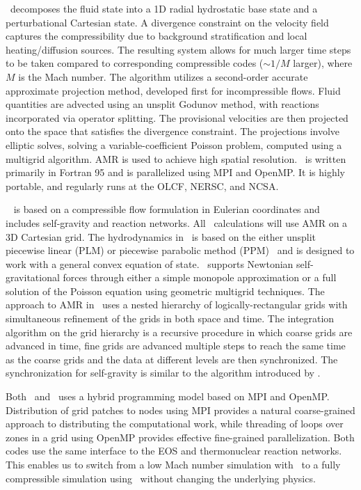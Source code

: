 \maestro\ decomposes the fluid state into a 1D radial hydrostatic base
state and a perturbational Cartesian state.  A divergence constraint
on the velocity field captures the compressibility due to background
stratification and local heating/diffusion sources.  The resulting
system allows for much larger time steps to be taken compared to
corresponding compressible codes ($\sim 1/M$ larger), where $M$ is 
the Mach number.
The algorithm
\cite{multilevel} utilizes a second-order accurate approximate
projection method, developed first for incompressible flows.  Fluid
quantities are advected using an unsplit Godunov method, with
reactions incorporated via operator splitting.  The provisional
velocities are then projected onto the space that satisfies the
divergence constraint.  The projections involve elliptic solves,
solving a variable-coefficient Poisson problem,
computed using a multigrid algorithm.  AMR is
used to achieve high spatial resolution.  \maestro\ is written primarily
in Fortran 95 and is parallelized using MPI and OpenMP.  It is highly
portable, and regularly runs at the OLCF, NERSC, and NCSA.

\castro~\cite{castro} is based on a compressible flow formulation in
Eulerian coordinates and includes self-gravity and reaction networks.
All \castro\ calculations will use AMR on a 3D Cartesian grid.  The
hydrodynamics in \castro\ is based on the either unsplit piecewise
linear (PLM) or piecewise parabolic method (PPM)~\cite{ppmunsplit} and
is designed to work with a general convex equation of state.
\castro\ supports Newtonian self-gravitational forces through either a
simple monopole approximation or a full solution of the Poisson
equation using geometric multigrid techniques.  The approach to AMR in
\castro\ uses a nested hierarchy of logically-rectangular grids with
simultaneous refinement of the grids in both space and time.  The
integration algorithm on the grid hierarchy is a recursive procedure
in which coarse grids are advanced in time, fine grids are advanced
multiple steps to reach the same time as the coarse grids and the data
at different levels are then synchronized.  The synchronization for
self-gravity is similar to the algorithm introduced by
\cite{miniati-colella}.  

Both \maestro\ and \castro\ uses a hybrid
programming model based on MPI and OpenMP.  Distribution of grid
patches to nodes using MPI provides a natural coarse-grained approach
to distributing the computational work, while threading of loops over
zones in a grid using OpenMP provides effective fine-grained parallelization.
Both codes use the same interface to the EOS and 
thermonuclear reaction networks.  This enables us to
switch from a low Mach number simulation with \maestro\ to a fully
compressible simulation using \castro\ without changing the underlying
physics.  

